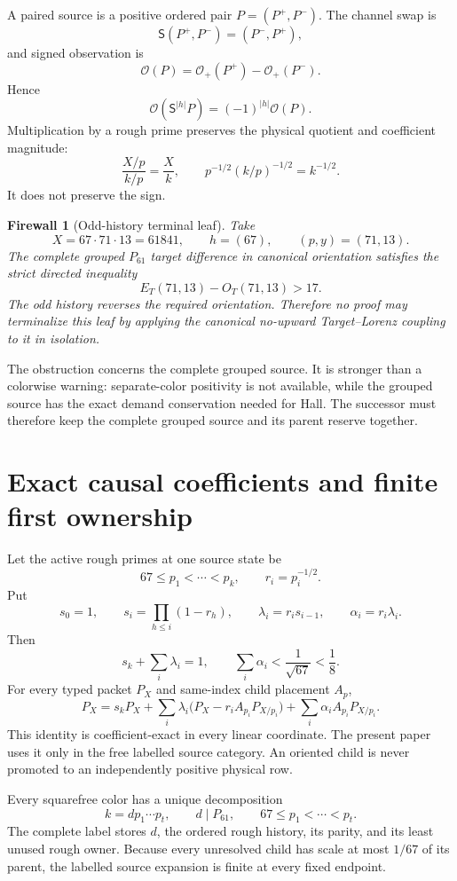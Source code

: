 \documentclass[11pt]{article}
\newtheorem{firewall}[theorem]{Firewall}
\newcommand{\Obs}{\mathcal O}
\newcommand{\1}{\mathbf 1}
\begin{document}
A paired source is a positive ordered pair $P=(P^+,P^-)$.  The channel swap is
\[
 \mathsf S(P^+,P^-)=(P^-,P^+),
\]
and signed observation is
\[
 \Obs(P)=\Obs_+(P^+)-\Obs_+(P^-).
\]
Hence
\[
 \Obs(\mathsf S^{|h|}P)=(-1)^{|h|}\Obs(P).
\]
Multiplication by a rough prime preserves the physical quotient and coefficient magnitude:
\[
 \frac{X/p}{k/p}=\frac Xk,
 \qquad
 p^{-1/2}(k/p)^{-1/2}=k^{-1/2}.
\]
It does not preserve the sign.

\begin{firewall}[Odd-history terminal leaf]\label{fw:odd}
Take
\[
 X=67\cdot71\cdot13=61841,
 \qquad h=(67),
 \qquad (p,y)=(71,13).
\]
The complete grouped $P_{61}$ target difference in canonical orientation satisfies the strict directed inequality
\[
 E_T(71,13)-O_T(71,13)>17.
\]
The odd history reverses the required orientation.  Therefore no proof may terminalize this leaf by applying the canonical no-upward Target--Lorenz coupling to it in isolation.
\end{firewall}

The obstruction concerns the complete grouped source.  It is stronger than a colorwise warning: separate-color positivity is not available, while the grouped source has the exact demand conservation needed for Hall.  The successor must therefore keep the complete grouped source and its parent reserve together.

\section{Exact causal coefficients and finite first ownership}

Let the active rough primes at one source state be
\[
 67\le p_1<\cdots<p_k,
 \qquad r_i=p_i^{-1/2}.
\]
Put
\[
 s_0=1,
 \qquad s_i=\prod_{h\le i}(1-r_h),
 \qquad \lambda_i=r_i s_{i-1},
 \qquad \alpha_i=r_i\lambda_i.
\]
Then
\[
 s_k+\sum_i\lambda_i=1,
 \qquad
 \sum_i\alpha_i<\frac1{\sqrt{67}}<\frac18.
\]
For every typed packet $P_X$ and same-index child placement $A_p$,
\begin{equation}\label{eq:causal}
 P_X=s_kP_X+\sum_i\lambda_i\bigl(P_X-r_iA_{p_i}P_{X/p_i}\bigr)
 +\sum_i\alpha_iA_{p_i}P_{X/p_i}.
\end{equation}
This identity is coefficient-exact in every linear coordinate.  The present paper uses it only in the free labelled source category.  An oriented child is never promoted to an independently positive physical row.

Every squarefree color has a unique decomposition
\[
 k=d p_1\cdots p_t,
 \qquad d\mid P_{61},
 \qquad67\le p_1<\cdots<p_t.
\]
The complete label stores $d$, the ordered rough history, its parity, and its least unused rough owner.  Because every unresolved child has scale at most $1/67$ of its parent, the labelled source expansion is finite at every fixed endpoint.
\end{document}
